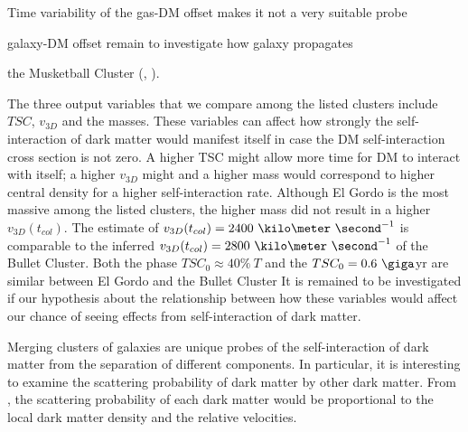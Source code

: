 

% 

Time variability of the gas-DM offset makes it not a very suitable probe

galaxy-DM offset remain to investigate how galaxy propagates 

the Musketball Cluster (\citealt{Dawson12}, ). 


The three output variables that we compare among the listed clusters include $TSC$,
$v_{3D}$ and the masses. These variables can affect
how strongly the self-interaction of dark matter would manifest itself in
case the DM self-interaction cross section is not zero. A higher TSC might
allow more time for DM to interact with itself; a higher $v_{3D}$ might
 and a higher mass would correspond to
higher central density for a higher self-interaction rate. Although El
Gordo is the most massive among the listed clusters, the higher mass did not result in a higher $v_{3D}(t_{col})$.
The estimate of $v_{3D}(t_{col}) = 2400~\kilo\meter~\second^{-1}$ is
comparable to the inferred $v_{3D}(t_{col}) =
2800~\kilo\meter~\second^{-1}$ of the Bullet Cluster. 
Both the phase $TSC_0  \approx 40\%~T$ and the $TSC_0 = 0.6~\giga$yr are
similar between El Gordo and the Bullet Cluster
It is remained to be investigated if our hypothesis about the relationship
between how these variables would affect our chance of seeing effects from
self-interaction of dark matter. 


Merging clusters of galaxies are unique probes of the self-interaction of
dark matter from the separation of different components. In particular, it
is interesting to examine the scattering probability of dark matter by other dark matter. 
From \cite{Randall2008d}, the scattering probability of each dark matter
would be proportional to the local dark matter density and the relative
velocities. 


